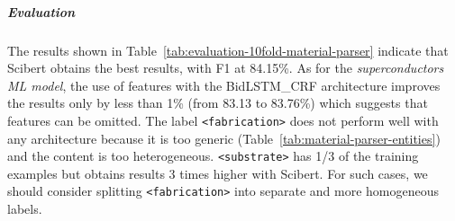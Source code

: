 \documentclass{article}
\begin{document}
\subparagraph{Evaluation}

The results shown in Table~\ref{tab:evaluation-10fold-material-parser} indicate that Scibert obtains the best results, with F1 at 84.15\%.
As for the \textit{superconductors ML model}, the use of features with the BidLSTM\_CRF architecture improves the results only by less than 1\% (from 83.13 to 83.76\%) which suggests that features can be omitted. 
The label \texttt{<fabrication>} does not perform well with any architecture because it is too generic (Table~\ref{tab:material-parser-entities}) and the content is too heterogeneous. \texttt{<substrate>} has 1/3 of the training examples but obtains results 3 times higher with Scibert. 
For such cases, we should consider splitting \texttt{<fabrication>} into separate and more homogeneous labels. 

\begin{table}[ht]
\centering\small
{}
\end{table}
\end{document}
